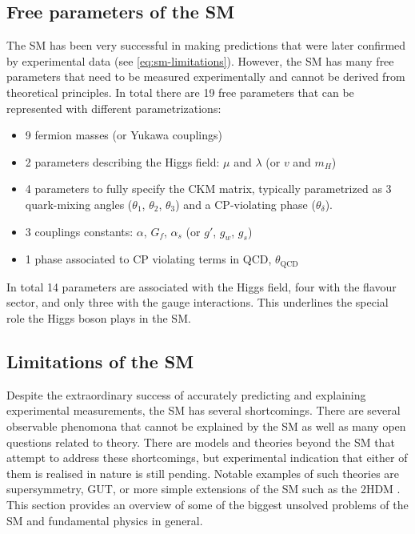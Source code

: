 

\subsection{Free parameters of the SM}
\label{subsec:free-pars-sm}
The SM has been very successful in making predictions that were later confirmed by experimental data (see \cref{eq:sm-limitations}). However, the SM has many free parameters that need to be measured experimentally and cannot be derived from theoretical principles.  
In total there are 19 free parameters that can be represented with different parametrizations:
\begin{itemize}
  \item 9 fermion masses (or Yukawa couplings)
  \item 2 parameters describing the Higgs field: $\mu$ and $\lambda$ (or $v$ and $m_H$)
  \item 4 parameters to fully specify the CKM matrix, typically parametrized as 3 quark-mixing angles ($\theta_1$, $\theta_2$, $\theta_3$) and a CP-violating phase ($\theta_\delta$).
  \item 3 couplings constants: $\alpha$, $G_f$, $\alpha_s$ (or $g'$, $g_w$, $g_s$)
  \item 1 phase associated to CP violating terms in QCD, $\theta_{\text{QCD}}$
\end{itemize}
In total 14 parameters are associated with the Higgs field, four with the flavour sector, and only three with the gauge interactions. This underlines the special role the Higgs boson plays in the SM.


\subsection{Limitations of the SM}
\label{subsec:limitations}
Despite the extraordinary success of accurately predicting and explaining experimental measurements, the SM has several shortcomings.
There are several observable phenomona that cannot be explained by the SM as well as many open questions related to theory. 
There are models and theories beyond the SM that attempt to address these shortcomings, but experimental indication that either of them is realised in nature is still pending.
Notable examples of such theories are supersymmetry, GUT, or more simple extensions of the SM such as the 2HDM . 
This section provides an overview of some of the biggest unsolved problems of the SM and fundamental physics in general.


